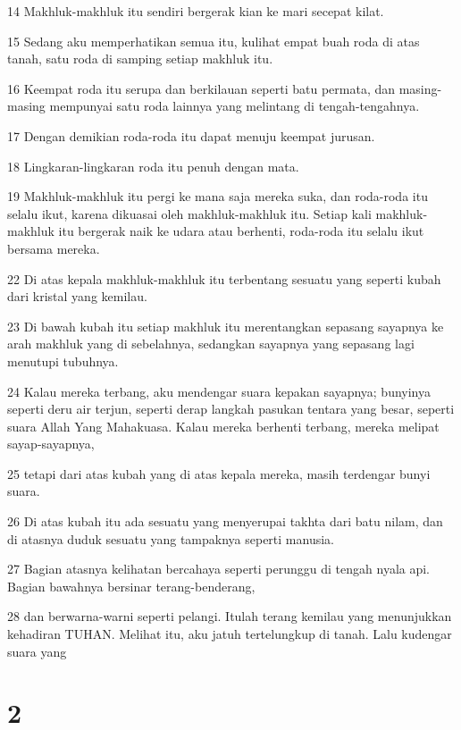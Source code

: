 \par 14 Makhluk-makhluk itu sendiri bergerak kian ke mari secepat kilat.
\par 15 Sedang aku memperhatikan semua itu, kulihat empat buah roda di atas tanah, satu roda di samping setiap makhluk itu.
\par 16 Keempat roda itu serupa dan berkilauan seperti batu permata, dan masing-masing mempunyai satu roda lainnya yang melintang di tengah-tengahnya.
\par 17 Dengan demikian roda-roda itu dapat menuju keempat jurusan.
\par 18 Lingkaran-lingkaran roda itu penuh dengan mata.
\par 19 Makhluk-makhluk itu pergi ke mana saja mereka suka, dan roda-roda itu selalu ikut, karena dikuasai oleh makhluk-makhluk itu. Setiap kali makhluk-makhluk itu bergerak naik ke udara atau berhenti, roda-roda itu selalu ikut bersama mereka.
\par 22 Di atas kepala makhluk-makhluk itu terbentang sesuatu yang seperti kubah dari kristal yang kemilau.
\par 23 Di bawah kubah itu setiap makhluk itu merentangkan sepasang sayapnya ke arah makhluk yang di sebelahnya, sedangkan sayapnya yang sepasang lagi menutupi tubuhnya.
\par 24 Kalau mereka terbang, aku mendengar suara kepakan sayapnya; bunyinya seperti deru air terjun, seperti derap langkah pasukan tentara yang besar, seperti suara Allah Yang Mahakuasa. Kalau mereka berhenti terbang, mereka melipat sayap-sayapnya,
\par 25 tetapi dari atas kubah yang di atas kepala mereka, masih terdengar bunyi suara.
\par 26 Di atas kubah itu ada sesuatu yang menyerupai takhta dari batu nilam, dan di atasnya duduk sesuatu yang tampaknya seperti manusia.
\par 27 Bagian atasnya kelihatan bercahaya seperti perunggu di tengah nyala api. Bagian bawahnya bersinar terang-benderang,
\par 28 dan berwarna-warni seperti pelangi. Itulah terang kemilau yang menunjukkan kehadiran TUHAN. Melihat itu, aku jatuh tertelungkup di tanah. Lalu kudengar suara yang

\chapter{2}

